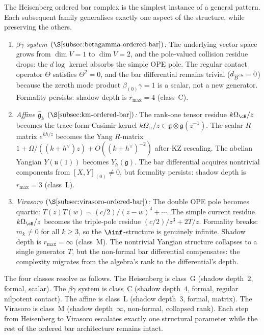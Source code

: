 \begin{remark}
\label{rem:heisenberg-prototype}
The Heisenberg ordered bar complex is the simplest instance of a
general pattern. Each subsequent family generalises exactly one
aspect of the structure, while preserving the others.
\begin{enumerate}[nosep]
\item \emph{$\beta\gamma$ system
 $(\S\ref{subsec:betagamma-ordered-bar})$:}
 The underlying vector space grows from $\dim V = 1$ to $\dim V = 2$,
 and the pole-valued collision residue drops: the $d\log$ kernel
 absorbs the simple OPE pole. The regular contact operator
 $\Theta$ satisfies $\Theta^2=0$, and the bar differential remains
 trivial ($d_{\overline{B}^{\mathrm{ch}}} = 0$) because the zeroth mode product
 $\beta_{(0)}\gamma = 1$ is a scalar, not a new generator. Formality
 persists: shadow depth is $r_{\max}=4$ (class~C).

\item \emph{Affine $\widehat{\mathfrak{g}}_k$
 $(\S\ref{subsec:km-ordered-bar})$:}
 The rank-one tensor residue $k\Omega_{\cH}/z$ becomes the
 trace-form Casimir kernel
 $k\Omega_{\mathrm{tr}}/z \in \mathfrak{g}\otimes\mathfrak{g}(z^{-1})$.
 The scalar $R$-matrix $e^{k\hbar/z}$ becomes the Yang $R$-matrix
 $1+\Omega/((k+h^\vee)z)+O((k+h^\vee)^{-2})$ after KZ rescaling. The abelian Yangian
 $Y(\mathfrak{u}(1))$ becomes $Y_\hbar(\mathfrak{g})$. The bar
 differential acquires nontrivial components from $[X,Y]_{(0)} \neq 0$,
 but formality persists: shadow depth is $r_{\max} = 3$ (class~L).

\item \emph{Virasoro $(\S\ref{subsec:virasoro-ordered-bar})$:}
 The double OPE pole becomes quartic: $T(z)T(w) \sim (c/2)/(z-w)^4
 + \cdots$. The simple current residue $k\Omega_{\cH}/z$ becomes the
 triple-pole residue $(c/2)/z^3 + 2T/z$. Formality breaks: $m_k \neq 0$ for all $k\ge 3$, so the
 $\Ainf$-structure is genuinely infinite. Shadow depth is
 $r_{\max} = \infty$ (class~M). The nontrivial Yangian structure
 collapses to a single generator $T$, but the non-formal bar
 differential compensates: the complexity migrates from the algebra's
 rank to the differential's depth.
\end{enumerate}

\noindent
The four classes resolve as follows. The Heisenberg is class~G (shadow
depth~$2$, formal, scalar). The $\beta\gamma$ system is class~C (shadow
depth~$4$, formal, regular nilpotent contact). The affine is class~L (shadow
depth~$3$, formal, matrix). The Virasoro is class~M (shadow
depth~$\infty$, non-formal, collapsed rank).
Each step from Heisenberg to Virasoro escalates exactly one structural
parameter while the rest of the ordered bar architecture remains
intact.
\end{remark}


